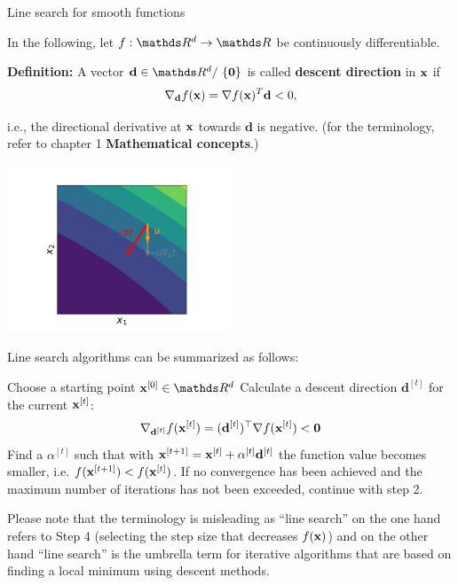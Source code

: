 \begin{vbframe}{Line search for smooth functions}

	In the following, let $f: \R^d \to \R$ be continuously differentiable.
	
	\lz
	
	\textbf{Definition:} A vector $\mathbf{d}\in \R^d /\ \{\mathbf{0}\}$ is called \textbf{descent direction} in $\mathbf{x}$ if
	$$
	\nabla_{\mathbf{d}} f(\mathbf{x}) = \nabla f(\mathbf{x}) ^T \mathbf{d} < 0,
	$$
	
	i.e., the directional derivative at $\mathbf{x}$ towards $\mathbf{d}$ is negative.
	(for the terminology, refer to chapter 1 \textbf{Mathematical concepts}.)
	\vspace*{-0.2cm}
	\begin{center}
		\includegraphics[width = 0.5\textwidth]{figure_man/descent_direction.png}
	\end{center}
	
	\framebreak
	
	Line search algorithms can be summarized as follows:
	\vspace*{-0.2cm}
	\begin{algorithm}[H]
	  \caption{Line search}
	  \begin{algorithmic}[1]
	  \State Choose a starting point $\xv^{[0]} \in \R^d$
	    \State Calculate a descent direction $\mathbf{d}^{[t]}$ for the current $\mathbf{x}^{[t]}$:
	$$
	\nabla_{\mathbf{d}^{[t]}} f(\mathbf{x}^{[t]}) = (\mathbf{d}^{[t]})^\top\nabla f(\mathbf{x}^{[t]}) < \mathbf{0}
	$$
	    \State Find a $\alpha^{[t]}$ such that with $\mathbf{x}^{[t + 1]} = \mathbf{x}^{[t]} + \alpha^{[t]} \mathbf{d}^{[t]}$
	  the function value becomes smaller, i.e. $f(\mathbf{x}^{[t + 1]}) < f(\mathbf{x}^{[t]})$.
	    \State If no convergence has been achieved and the maximum number of iterations
	has not been exceeded, continue with step 2.
	  \EndFor
	  \end{algorithmic}
	\end{algorithm}
	\vspace*{-0.2cm}
	\begin{tiny}
		Please note that the terminology is misleading as ``line search'' on the one hand refers to Step 4 (selecting the step size that decreases $f(\mathbf{x})$) and on the other hand ``line search'' is the umbrella term for iterative algorithms that are based on finding a local minimum using descent methods. \par
	\end{tiny}
\end{vbframe}



